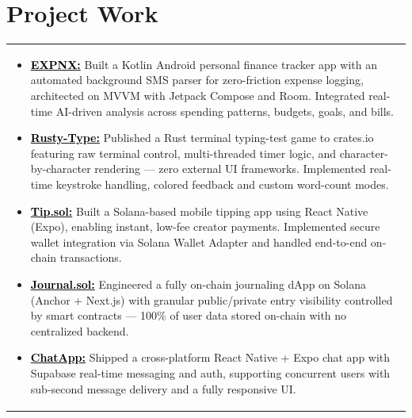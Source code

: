 \documentclass[a4paper,10pt]{article}
\begin{document}
\section{Project Work}
\begin{tabularx}{\linewidth}{@{}X@{}}
    \begin{itemize}[nosep, after=\strut, leftmargin=2em, itemsep=2pt]
        \item \textbf{\href{https://expnx.delwin.xyz/}{\textcolor{black}{EXPNX:}}} Built a Kotlin Android personal finance tracker app with an automated background SMS parser for zero-friction expense logging, architected on MVVM with Jetpack Compose and Room. Integrated real-time AI-driven analysis across spending patterns, budgets, goals, and bills.
    
        \item \textbf{\href{https://crates.io/crates/rusty-type}{\textcolor{black}{Rusty-Type:}}} Published a Rust terminal typing-test game to crates.io featuring raw terminal control, multi-threaded timer logic, and character-by-character rendering — zero external UI frameworks. Implemented real-time keystroke handling, colored feedback and custom word-count modes.

        \item \textbf{\href{https://drive.google.com/drive/folders/1zzEA-a7uvQMQkMIfpMbOHBisFKnyKKTE?usp=drive_link}{\textcolor{black}{Tip.sol:}}} Built a Solana-based mobile tipping app using React Native (Expo), enabling instant, low-fee creator payments. Implemented secure wallet integration via Solana Wallet Adapter and handled end-to-end on-chain transactions.
        
        \item \textbf{\href{https://journal-sol-one.vercel.app}{\textcolor{black}{Journal.sol:}}} Engineered a fully on-chain journaling dApp on Solana (Anchor + Next.js) with granular public/private entry visibility controlled by smart contracts — 100\% of user data stored on-chain with no centralized backend.
 
        \item \textbf{\href{https://github.com/DelwinPrakash/chatapp}{\textcolor{black}{ChatApp:}}} Shipped a cross-platform React Native + Expo chat app with Supabase real-time messaging and auth, supporting concurrent users with sub-second message delivery and a fully responsive UI.

    \end{itemize}
\end{tabularx}
\end{document}
